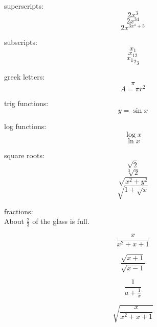 \documentclass[11pt]{article}
\begin{document}
superscripts: $$2x^3$$
$$2x^{34}$$
$$2x^{3x^4+5}$$

subscripts:
$$x_1$$
$$x_{12}$$
$${{x_1}_2}_3$$

greek letters:
$$\pi$$
$$A=\pi r^2$$

trig functions:
$$y=\sin{x}$$

log functions:
$$\log{x}$$
$$\ln{x}$$

square roots:
$$\sqrt{2}$$
$$\sqrt[3]{2}$$
$$\sqrt{x^2+y^2}$$
$$\sqrt{1+\sqrt{x}}$$

fractions:\\

About $\displaystyle{\frac{2}{3}}$ of the glass is full.

$$\frac{x}{x^2+x+1}$$

$$\frac{\sqrt{x+1}}{\sqrt{x-1}}$$

$$\frac{1}{a+\frac{1}{x}}$$

$$\sqrt{\frac{x}{x^2+x+1}}$$
\end{document}
